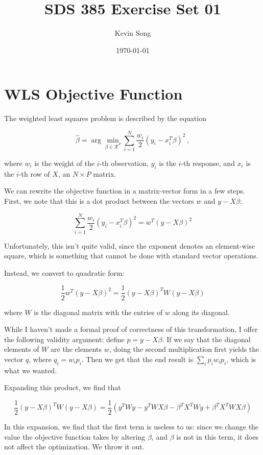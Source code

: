 \documentclass{article}
\title{SDS 385 Exercise Set 01}
\author{Kevin Song}
\date{\today}
\begin{document}
\maketitle

\section{WLS Objective Function}

The weighted least squares problem is described by the equation

\[
\hat{\beta} = \arg \min_{\beta \in \mathcal{R}^P} \sum_{i=1}^N \frac{w_i}{2}(y_i
- x_i^T \beta)^2 \, ,
\]

where $w_i$ is the weight of the $i$-th observation, $y_i$ is the $i$-th
response, and $x_i$ is the $i$-th row of $X$, an $N \times P$ matrix.

We can rewrite the objective function in a matrix-vector form in a few steps. First, we note that
this is a dot product between the vectors $w$ and $y - X\beta$:

\[
 \sum_{i=1}^N \frac{w_i}{2}(y_i - x_i^T \beta)^2 = w^T (y - X\beta)^2
\]

Unfortunately, this isn't quite valid, since the exponent denotes an
element-wise square, which is something that cannot be done with standard vector
operations.

Instead, we convert to quadratic form:

\[
\frac{1}{2} w^T (y - X\beta)^2 =\frac{1}{2} (y - X\beta)^T W (y - X\beta)
\]

where $W$ is the diagonal matrix with the entries of $w$ along its diagonal.

While I haven't made a formal proof of correctness of this transformation, I
offer the following validity argument: define $p = y - X\beta$. If we say that
the diagonal elements of $W$ are the elements $w$, doing the second multiplication
first yields the vector $q$, where $q_i = w_ip_i$. Then we get that the end
result is $\sum_i p_i w_i p_i$, which is what we wanted.

Expanding this product, we find that

\[
  \frac{1}{2} (y - X\beta)^T W (y - X\beta) =
  \frac{1}{2} \left( y^TWy - y^TWX\beta - \beta^TX^TWy + \beta^TX^TWX\beta \right)
\]

In this expansion, we find that the first term is useless to us: since we change
the value the objective function takes by altering $\beta$, and $\beta$ is not
in this term, it does not affect the optimization. We throw it out.
\end{document}
